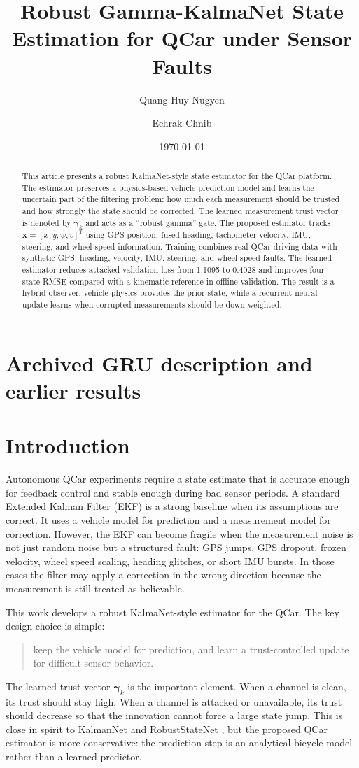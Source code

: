 \documentclass[11pt,a4paper]{article}
\title{\vspace{-1em}Robust Gamma-KalmaNet State Estimation for QCar under Sensor Faults}
\author{Quang Huy Nugyen \and Echrak Chnib}
\date{\today}
\newcommand{\state}{\bm{x}}
\newcommand{\trust}{\bm{\gamma}}
\begin{document}
\maketitle

\section*{Archived GRU description and earlier results}

\begin{abstract}
This article presents a robust KalmaNet-style state estimator for the QCar
platform. The estimator preserves a physics-based vehicle prediction model and
learns the uncertain part of the filtering problem: how much each measurement
should be trusted and how strongly the state should be corrected. The learned
measurement trust vector is denoted by $\trust_k$ and acts as a ``robust
gamma'' gate. The proposed estimator tracks $\state=[x,y,\psi,v]^T$ using GPS
position, fused heading, tachometer velocity, IMU, steering, and wheel-speed
information. Training combines real QCar driving data with synthetic GPS,
heading, velocity, IMU, steering, and wheel-speed faults. The learned estimator
reduces attacked validation loss from 1.1095 to 0.4028 and improves four-state
RMSE compared with a kinematic reference in offline validation. The result is a
hybrid observer: vehicle physics provides the prior state, while a recurrent
neural update learns when corrupted measurements should be down-weighted.
\end{abstract}

\section{Introduction}

Autonomous QCar experiments require a state estimate that is accurate enough
for feedback control and stable enough during bad sensor periods. A standard
Extended Kalman Filter (EKF) is a strong baseline when its assumptions are
correct. It uses a vehicle model for prediction and a measurement model for
correction. However, the EKF can become fragile when the measurement noise is
not just random noise but a structured fault: GPS jumps, GPS dropout, frozen
velocity, wheel speed scaling, heading glitches, or short IMU bursts. In those
cases the filter may apply a correction in the wrong direction because the
measurement is still treated as believable.

This work develops a robust KalmaNet-style estimator for the QCar.
The key design choice is simple:
\begin{quote}
  keep the vehicle model for prediction, and learn a trust-controlled update
  for difficult sensor behavior.
\end{quote}
The learned trust vector $\trust_k$ is the important element. When a channel is
clean, its trust should stay high. When a channel is attacked or unavailable,
its trust should decrease so that the innovation cannot force a large state
jump. This is close in spirit to KalmanNet \cite{revach2022kalmannet} and
RobustStateNet \cite{dahal2024robuststatenet}, but the proposed QCar estimator
is more conservative: the prediction step is an analytical bicycle model rather
than a learned predictor.
\end{document}
